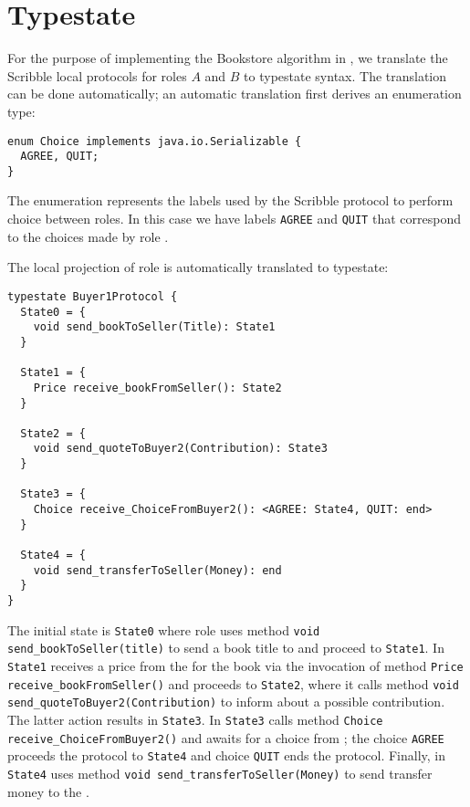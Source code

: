 \section{Typestate}

For the purpose of implementing the Bookstore
algorithm in \Mungo,
we translate the Scribble local protocols for roles
$A$ and $B$ to \Mungo typestate syntax.
The translation can be done automatically;
an automatic translation first derives an
enumeration type:

\begin{lstlisting}[caption={Enumeration for the communication choice}]
enum Choice implements java.io.Serializable {
  AGREE, QUIT;
}
\end{lstlisting}

The enumeration represents the
labels used by the Scribble protocol
to perform choice between roles. In this
case we have labels \lstinline|AGREE| and
\lstinline|QUIT| that correspond to the choices
made by role \BuyerTwo.

The local projection of role \BuyerOne is automatically translated to typestate:

\begin{lstlisting}[caption={Typestate for Role \BuyerOne}]
typestate Buyer1Protocol {
  State0 = {
    void send_bookToSeller(Title): State1
  }

  State1 = {
    Price receive_bookFromSeller(): State2
  }

  State2 = {
    void send_quoteToBuyer2(Contribution): State3
  }

  State3 = {
    Choice receive_ChoiceFromBuyer2(): <AGREE: State4, QUIT: end>
  }

  State4 = {
    void send_transferToSeller(Money): end
  }
}
\end{lstlisting}

The initial state is \lstinline|State0| where
role \BuyerOne uses method \lstinline|void send_bookToSeller(title)|
to send a book title to \Seller
and proceed to \lstinline|State1|. In \lstinline|State1|
\BuyerOne receives a price from the \Seller for the book via
the invocation of method \lstinline|Price receive_bookFromSeller()|
and proceeds to \lstinline|State2|, where
it calls method \lstinline|void send_quoteToBuyer2(Contribution)|
to inform \BuyerTwo about a  possible contribution. The latter
action results in \lstinline|State3|.
In \lstinline|State3| \BuyerOne calls method
\lstinline|Choice receive_ChoiceFromBuyer2()| and awaits
for a choice from \BuyerTwo; the choice \lstinline|AGREE|
proceeds the protocol to \lstinline|State4| and
choice \lstinline|QUIT| ends the protocol. Finally,
in \lstinline|State4| \BuyerOne uses method
\lstinline|void send_transferToSeller(Money)| to
send transfer money to the \Seller.


